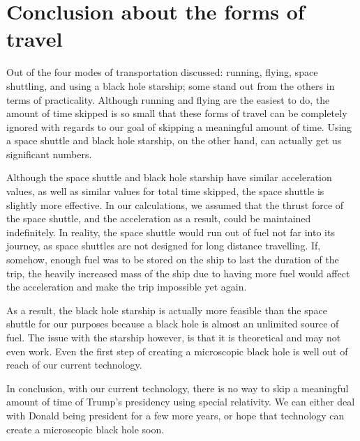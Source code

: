 \chapter{Conclusion about the forms of travel}
	Out of the four modes of transportation discussed: running, flying, space shuttling, and using a black hole starship; some stand out from the others in terms of practicality. Although running and flying are the easiest to do, the amount of time skipped is so small that these forms of travel can be completely ignored with regards to our goal of skipping a meaningful amount of time. Using a space shuttle and black hole starship, on the other hand, can actually get us significant numbers.

	Although the space shuttle and black hole starship have similar acceleration values, as well as similar values for total time skipped, the space shuttle is slightly more effective. In our calculations, we assumed that the thrust force of the space shuttle, and the acceleration as a result, could be maintained indefinitely. In reality, the space shuttle would run out of fuel not far into its journey, as space shuttles are not designed for long distance travelling. If, somehow, enough fuel was to be stored on the ship to last the duration of the trip, the heavily increased mass of the ship due to having more fuel would affect the acceleration and make the trip impossible yet again.

	As a result, the black hole starship is actually more feasible than the space shuttle for our purposes because a black hole is almost an unlimited source of fuel. The issue with the starship however, is that it is theoretical and may not even work. Even the first step of creating a microscopic black hole is well out of reach of our current technology.

	In conclusion, with our current technology, there is no way to skip a meaningful amount of time of Trump’s presidency using special relativity. We can either deal with Donald being president for a few more years, or hope that technology can create a microscopic black hole soon.
